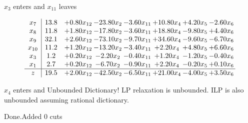 \documentclass[8pt]{article}
\begin{document}
 $ x_{3} $ enters and $ x_{11} $ leaves 

 \[\begin{array}{c| c c@{\hskip 2pt} c@{\hskip 2pt} c@{\hskip 2pt} c@{\hskip 2pt} c@{\hskip 2pt} c@{\hskip 2pt} }
 x_{7}   &  13.8 & +  0.80 x_{12} & -23.80 x_{2} & -3.60 x_{11} & + 10.80 x_{4} & +  4.20 x_{5} & -2.60 x_{6}\\
 x_{8}   &  11.8 & +  1.80 x_{12} & -17.80 x_{2} & -3.60 x_{11} & + 18.80 x_{4} & -9.80 x_{5} & +  4.40 x_{6}\\
 x_{9}   &  32.1 & +  2.60 x_{12} & -73.10 x_{2} & -9.70 x_{11} & + 34.60 x_{4} & -9.60 x_{5} & -6.70 x_{6}\\
 x_{10}   &  11.2 & +  1.20 x_{12} & -13.20 x_{2} & -3.40 x_{11} & +  2.20 x_{4} & +  4.80 x_{5} & +  6.60 x_{6}\\
 x_{3}   &  1.2 & +  0.20 x_{12} & -2.20 x_{2} & -0.40 x_{11} & +  1.20 x_{4} & -1.20 x_{5} & -0.40 x_{6}\\
 x_{1}   &  2.7 & +  0.20 x_{12} & -6.70 x_{2} & -0.90 x_{11} & +  2.20 x_{4} & -0.20 x_{5} & +  0.10 x_{6}\\
\hline
z    &  19.5 & +  2.00 x_{12} & -42.50 x_{2} & -6.50 x_{11} & + 21.00 x_{4} & -4.00 x_{5} & +  3.50 x_{6}\\
\end{array}\]


 $ x_{4} $ enters and Unbounded Dictionary!
 LP relaxation is unbounded. ILP is also unbounded assuming rational dictionary. 

Done.Added 0 cuts 
\end{document}
